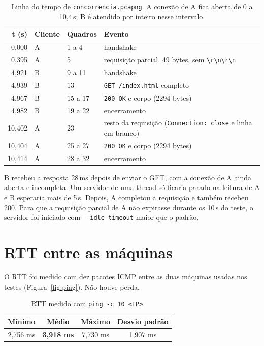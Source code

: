 \documentclass[11pt,a4paper]{article}
\newcommand{\cod}[1]{\texttt{#1}}
\begin{document}
\begin{table}[H]
\centering
\small
\begin{tabular}{@{}rlll@{}}
\toprule
\textbf{t (s)} & \textbf{Cliente} & \textbf{Quadros} & \textbf{Evento} \\
\midrule
0,000 & A & 1 a 4 & handshake \\
0,395 & A & 5 & requisição parcial, 49 bytes, sem \cod{\textbackslash r\textbackslash n\textbackslash r\textbackslash n} \\
4,921 & B & 9 a 11 & handshake \\
4,939 & B & 13 & \cod{GET /index.html} completo \\
4,967 & B & 15 a 17 & \cod{200 OK} e corpo (2294 bytes) \\
4,982 & B & 19 a 22 & encerramento \\
10,402 & A & 23 & resto da requisição (\cod{Connection: close} e linha em branco) \\
10,404 & A & 25 a 27 & \cod{200 OK} e corpo (2294 bytes) \\
10,414 & A & 28 a 32 & encerramento \\
\bottomrule
\end{tabular}
\caption{Linha do tempo de \cod{concorrencia.pcapng}. A conexão de A fica
aberta de 0 a 10,4\,s; B é atendido por inteiro nesse intervalo.}
\label{tab:concorrencia}
\end{table}

B recebeu a resposta 28\,ms depois de enviar o GET, com a conexão de A ainda
aberta e incompleta. Um servidor de uma thread só ficaria parado na leitura de
A e B esperaria mais de 5\,s. Depois, A completou a requisição e também recebeu
200. Para que a requisição parcial de A não expirasse durante os 10\,s do
teste, o servidor foi iniciado com \cod{-{}-idle-timeout} maior que o padrão.

\section{RTT entre as máquinas}

O RTT foi medido com dez pacotes ICMP entre as duas máquinas usadas nos
testes (Figura~\ref{fig:ping}). Não houve perda.

\begin{table}[H]
\centering
\small
\begin{tabular}{@{}cccc@{}}
\toprule
\textbf{Mínimo} & \textbf{Médio} & \textbf{Máximo} & \textbf{Desvio padrão} \\
\midrule
2,756 ms & \textbf{3,918 ms} & 7,730 ms & 1,907 ms \\
\bottomrule
\end{tabular}
\caption{RTT medido com \cod{ping -c 10 <IP>}.}
\end{table}
\end{document}
